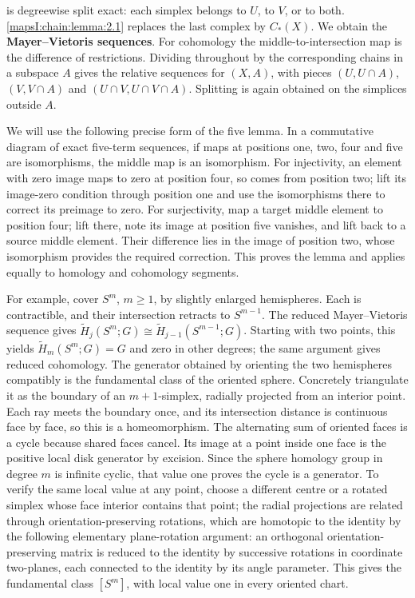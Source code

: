 is degreewise split exact: each simplex belongs to \(U\), to \(V\), or to both. \cref{mapsI:chain:lemma:2.1} replaces the last complex by \(C_*(X)\). We obtain the \textbf{Mayer--Vietoris sequences}. For cohomology the middle-to-intersection map is the difference of restrictions. Dividing throughout by the corresponding chains in a subspace \(A\) gives the relative sequences for \((X,A)\), with pieces \((U,U\cap A)\), \((V,V\cap A)\) and \((U\cap V,U\cap V\cap A)\). Splitting is again obtained on the simplices outside \(A\).

We will use the following precise form of the five lemma. In a commutative diagram of exact five-term sequences, if maps at positions one, two, four and five are isomorphisms, the middle map is an isomorphism. For injectivity, an element with zero image maps to zero at position four, so comes from position two; lift its image-zero condition through position one and use the isomorphisms there to correct its preimage to zero. For surjectivity, map a target middle element to position four; lift there, note its image at position five vanishes, and lift back to a source middle element. Their difference lies in the image of position two, whose isomorphism provides the required correction. This proves the lemma and applies equally to homology and cohomology segments.

For example, cover \(S^m\), \(m\geq1\), by slightly enlarged hemispheres. Each is contractible, and their intersection retracts to \(S^{m-1}\). The reduced Mayer--Vietoris sequence gives
\(\widetilde H_j(S^m;G)\cong\widetilde H_{j-1}(S^{m-1};G)\).
Starting with two points, this yields \(\widetilde H_m(S^m;G)=G\) and zero in other degrees; the same argument gives reduced cohomology. The generator obtained by orienting the two hemispheres compatibly is the fundamental class of the oriented sphere. Concretely triangulate it as the boundary of an \(m+1\)-simplex, radially projected from an interior point. Each ray meets the boundary once, and its intersection distance is continuous face by face, so this is a homeomorphism. The alternating sum of oriented faces is a cycle because shared faces cancel. Its image at a point inside one face is the positive local disk generator by excision. Since the sphere homology group in degree \(m\) is infinite cyclic, that value one proves the cycle is a generator. To verify the same local value at any point, choose a different centre or a rotated simplex whose face interior contains that point; the radial projections are related through orientation-preserving rotations, which are homotopic to the identity by the following elementary plane-rotation argument: an orthogonal orientation-preserving matrix is reduced to the identity by successive rotations in coordinate two-planes, each connected to the identity by its angle parameter. This gives the fundamental class \([S^m]\), with local value one in every oriented chart.


